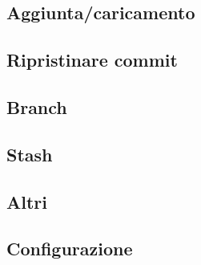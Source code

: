 \subsection{Aggiunta/caricamento}
\subsection{Ripristinare commit}
\subsection{Branch}
\subsection{Stash}
\subsection{Altri}
\subsection{Configurazione}